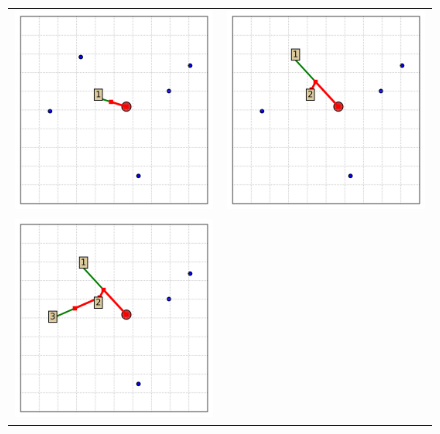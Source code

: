 \documentclass[11.5pt]{report}
\begin{document}

\begin{figure}[H]
\centering
\begin{tabular}{cc}
\includegraphics[width=8cm]{../webs/docs/algo-greedy-incremental-insertion---Day-2018-12-24_ClockTime-19:31:02/algo_state_00000.png}&
\includegraphics[width=8cm]{../webs/docs/algo-greedy-incremental-insertion---Day-2018-12-24_ClockTime-19:31:02/algo_state_00001.png}\\
\includegraphics[width=8cm]{../webs/docs/algo-greedy-incremental-insertion---Day-2018-12-24_ClockTime-19:31:02/algo_state_00002.png}&

\end{tabular}
\end{figure}
\end{document}
